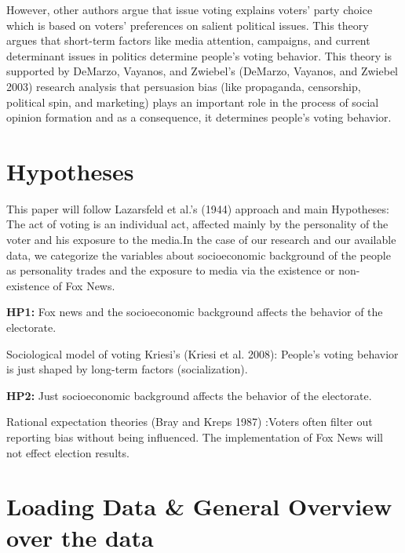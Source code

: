 \documentclass[
]{article}
\newenvironment{Shaded}{\begin{snugshade}}{\end{snugshade}}
\newcommand{\FunctionTok}[1]{\textcolor[rgb]{0.00,0.00,0.00}{#1}}
\newcommand{\NormalTok}[1]{#1}
\newcommand{\OtherTok}[1]{\textcolor[rgb]{0.56,0.35,0.01}{#1}}
\newcommand{\SpecialCharTok}[1]{\textcolor[rgb]{0.00,0.00,0.00}{#1}}
\newcommand{\StringTok}[1]{\textcolor[rgb]{0.31,0.60,0.02}{#1}}
\begin{document}
However, other authors argue that issue voting explains voters' party choice which is based on voters' preferences on salient political issues. This theory argues that short-term factors like media attention, campaigns, and current determinant issues in politics determine people's voting behavior. This theory is supported by DeMarzo, Vayanos, and Zwiebel's (DeMarzo, Vayanos, and Zwiebel 2003) research analysis that persuasion bias (like propaganda, censorship, political spin, and marketing) plays an important role in the process of social opinion formation and as a consequence, it determines people's voting behavior.

\hypertarget{hypotheses}{%
\section{Hypotheses}\label{hypotheses}}

This paper will follow Lazarsfeld et al.'s (1944) approach and main Hypotheses: The act of voting is an individual act, affected mainly by the personality of the voter and his exposure to the media.In the case of our research and our available data, we categorize the variables about socioeconomic background of the people as personality trades and the exposure to media via the existence or non-existence of Fox News.

\textbf{HP1:} Fox news and the socioeconomic background affects the behavior of the electorate.

Sociological model of voting Kriesi's (Kriesi et al. 2008): People's voting behavior is just shaped by long-term factors (socialization).

\textbf{HP2:} Just socioeconomic background affects the behavior of the electorate.

Rational expectation theories (Bray and Kreps 1987) :Voters often filter out reporting bias without being influenced. The implementation of Fox News will not effect election results.

\hypertarget{loading-data-general-overview-over-the-data}{%
\section{Loading Data \& General Overview over the data}\label{loading-data-general-overview-over-the-data}}

\begin{Shaded}
\end{Shaded}
\end{document}
